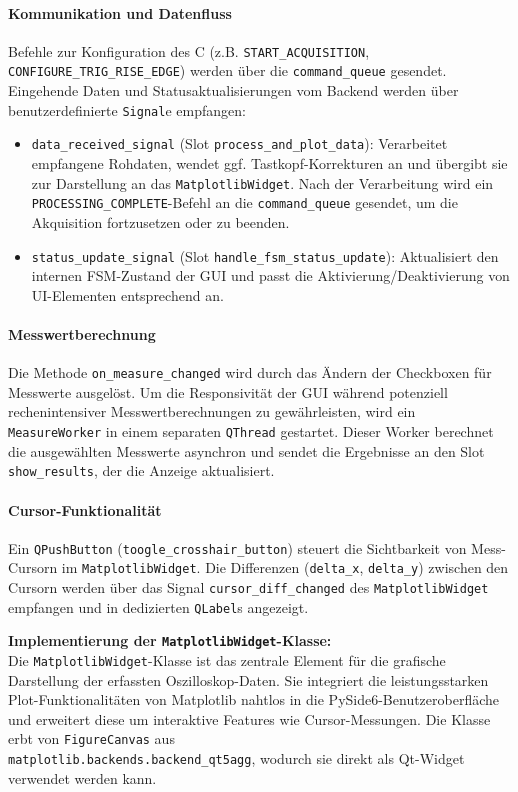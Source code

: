 \documentclass[a4paper, portrait, 12pt]{scrartcl} %
\begin{document}
\paragraph{Kommunikation und Datenfluss}
Befehle zur Konfiguration des \textmu C (z.B. \texttt{START\_ACQUISITION}, \texttt{CONFIGURE\_TRIG\_RISE\_EDGE}) werden über die \texttt{command\_queue} gesendet. Eingehende Daten und Statusaktualisierungen vom Backend werden über benutzerdefinierte \texttt{Signal}e empfangen:
\begin{itemize}
    \item \texttt{data\_received\_signal} (Slot \texttt{process\_and\_plot\_data}): Verarbeitet empfangene Rohdaten, wendet ggf. Tastkopf-Korrekturen an und übergibt sie zur Darstellung an das \texttt{MatplotlibWidget}. Nach der Verarbeitung wird ein \texttt{PROCESSING\_COMPLETE}-Befehl an die \texttt{command\_queue} gesendet, um die Akquisition fortzusetzen oder zu beenden.
    \item \texttt{status\_update\_signal} (Slot \texttt{handle\_fsm\_status\_update}): Aktualisiert den internen FSM-Zustand der GUI und passt die Aktivierung/Deaktivierung von UI-Elementen entsprechend an.
\end{itemize}

\paragraph{Messwertberechnung}
Die Methode \texttt{on\_measure\_changed} wird durch das Ändern der Checkboxen für Messwerte ausgelöst. Um die Responsivität der GUI während potenziell rechenintensiver Messwertberechnungen zu gewährleisten, wird ein \texttt{MeasureWorker} in einem separaten \texttt{QThread} gestartet. Dieser Worker berechnet die ausgewählten Messwerte asynchron und sendet die Ergebnisse an den Slot \texttt{show\_results}, der die Anzeige aktualisiert.

\paragraph{Cursor-Funktionalität}
Ein \texttt{QPushButton} (\texttt{toogle\_crosshair\_button}) steuert die Sichtbarkeit von Mess-Cursorn im \texttt{MatplotlibWidget}. Die Differenzen (\texttt{delta\_x}, \texttt{delta\_y}) zwischen den Cursorn werden über das Signal \texttt{cursor\_diff\_changed} des \texttt{MatplotlibWidget} empfangen und in dedizierten \texttt{QLabel}s angezeigt.

\textbf{Implementierung der \texttt{MatplotlibWidget}-Klasse:}\\
Die \texttt{MatplotlibWidget}-Klasse ist das zentrale Element für die grafische Darstellung der erfassten Oszilloskop-Daten. Sie integriert die leistungsstarken Plot-Funktionalitäten von Matplotlib nahtlos in die PySide6-Benutzeroberfläche und erweitert diese um interaktive Features wie Cursor-Messungen. Die Klasse erbt von \texttt{FigureCanvas} aus \\\texttt{matplotlib.backends.backend\_qt5agg}, wodurch sie direkt als Qt-Widget verwendet werden kann.
\end{document}
